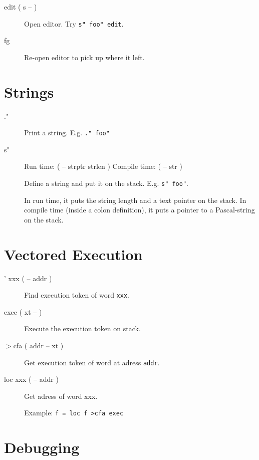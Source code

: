 \begin{description}
\item[edit ( s -- )]

Open editor. Try \texttt{s" foo" edit}.

\item[fg]

Re-open editor to pick up where it left.

\end{description}

\section{Strings}

\begin{description}
\item[."]

Print a string. E.g. \texttt{." foo"}

\item[s"] Run time: ( -- strptr strlen ) Compile time: ( -- str )

Define a string and put it on the stack. E.g. \texttt{s" foo"}. 

In run time, it puts the string length and a text pointer on the stack. In compile time (inside a colon definition), it puts a pointer to a Pascal-string on the stack.

\end{description}


\section{Vectored Execution}

\begin{description}
\item[' xxx ( -- addr )] Find execution token of word \texttt{xxx}.
\item[exec ( xt -- )] Execute the execution token on stack.
\item[$>$cfa ( addr -- xt )] Get execution token of word at adress \texttt{addr}.
\item[loc xxx ( -- addr )] Get adress of word xxx.

Example: \texttt{f = loc f >cfa exec}
\end{description}


\section{Debugging}

